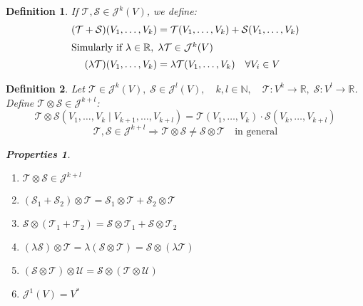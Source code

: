 \documentclass[12pt]{article}
\def\RR{\mathbb{R}}
\def\NN{\mathbb{N}}
\newtheorem{definition}{Definition}[section]
\newtheorem*{properties}{Properties}
\begin{document}
\begin{definition}
If $\mathcal{T},\mathcal{S} \in \mathcal{J}^k(V)$, we define:
\begin{align*}
(\mathcal{T} + \mathcal{S})(V_1, \dots , V_k) &= \mathcal{T}(V_1, \dots , V_k) + \mathcal{S}(V_1, \dots , V_k)\\
\intertext{Simularly if $\lambda \in \RR, \; \lambda\mathcal{T} \in \mathcal{J}^k(V)$}
(\lambda\mathcal{T})(V_1, \dots , V_k) &= \lambda\mathcal{T}(V_1, \dots , V_k)\quad \forall V_i \in V
\end{align*}
\end{definition}

\begin{definition}
Let $\mathcal{T} \in \mathcal{J}^k(V), \; \mathcal{S} \in  \mathcal{J}^l{}(V), \quad k,l \in \NN, \quad \mathcal{T}:V^k\rightarrow \RR, \;\mathcal{S}:V^l\rightarrow \RR$. Define $\mathcal{T} \otimes \mathcal{S} \in \mathcal{J}^{k+l}$:
\[\mathcal{T} \otimes \mathcal{S} (V_1,\dots,V_k\;|\;V_{k+1},\dots , V_{k+l}) = \mathcal{T}(V_1,\dots,V_k) \cdot \mathcal{S} (V_k,\dots,  V_{k+l})\]
\[\mathcal{T}, \mathcal{S} \in \mathcal{J}^{k+l} \Rightarrow \mathcal{T} \otimes \mathcal{S} \neq \mathcal{S} \otimes \mathcal{T}\quad \text{in general}\]
\begin{properties}\quad \\
\begin{enumerate}
\item $\mathcal{T} \otimes \mathcal{S} \in \mathcal{J}^{k+l}$
\item$(\mathcal{S}_1 + \mathcal{S}_2)\otimes\mathcal{T} = \mathcal{S}_1\otimes \mathcal{T} + \mathcal{S}_2 \otimes\mathcal{T}$
\item $\mathcal{S}\otimes (\mathcal{T}_1 + \mathcal{T}_2) = \mathcal{S}\otimes \mathcal{T}_1 + \mathcal{S}\otimes \mathcal{T}_2$
\item $(\lambda\mathcal{S})\otimes\mathcal{T} = \lambda(\mathcal{S}\otimes\mathcal{T}) = \mathcal{S}\otimes(\lambda\mathcal{T})$
\item $(\mathcal{S}\otimes\mathcal{T})\otimes\mathcal{U} = \mathcal{S}\otimes(\mathcal{T}\otimes\mathcal{U})$
\item $\mathcal{J}^1(V) = V^{*}$
\end{enumerate}
\end{properties}
\end{definition}
\end{document}

